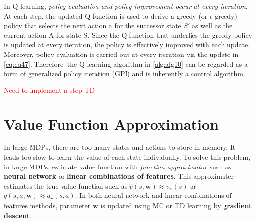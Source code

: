 \documentclass[
	10pt, %
]{article}
\theoremstyle{plain}
\newcommand{\mb}[1]{\mathbf{#1}}
\newcommand{\tb}[1]{\textbf{#1}}
\newcommand{\ti}[1]{\textit{#1}}
\numberwithin{equation}{subsection} %
\begin{document}
In Q-learning, \ti{policy evaluation and policy improvement occur at every iteration}. 
At each step, the updated Q-function is used to derive a greedy (or $\epsilon$-greedy) policy that selects the next action a for the successor state $S'$ as well as the current action A for state S. 
Since the Q-function that underlies the greedy policy is updated at every iteration, the policy is effectively improved with each update. 
Moreover, policy evaluation is carried out at every iteration via the update in \cref{eq:eq47}.
Therefore, the Q-learning algorithm in \cref{alg:alg10} can be regarded as a form of generalized policy iteration (GPI) and is inherently a control algorithm.

\textcolor{red}{Need to implement n-step TD}


\section{Value Function Approximation}
In large MDPs, there are too many states and actions to store in memory.
It leads too slow to learn the value of each state individually. 
To solve this problem, in large MDPs, estimate value function with \ti{function approximator} such as \tb{neural network} or \tb{linear combinations of features}. 
This approximater estimates the true value function such as $\hat{v}(s, \mb{w}) \approx v_\pi(s)$ or $\hat{q}(s,a,\mb{w}) \approx q_\pi(s,a)$.
In both neural network and linear combinations of features methods, parameter $\mb{w}$ is updated using MC or TD learning by \tb{gradient descent}.
\end{document}
